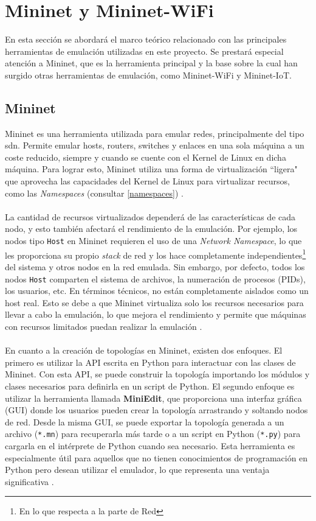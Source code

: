 \section{Mininet y Mininet-WiFi}
\label{sec:mininet}

En esta sección se abordará el marco teórico relacionado con las principales herramientas de emulación utilizadas en este proyecto. Se prestará especial atención a Mininet, que es la herramienta principal y la base sobre la cual han surgido otras herramientas de emulación, como Mininet-WiFi y Mininet-IoT.\\

\subsection{Mininet}

Mininet es una herramienta utilizada para emular redes, principalmente del tipo \gls{sdn}. Permite emular hosts, routers, switches y enlaces en una sola máquina a un coste reducido, siempre y cuando se cuente con el Kernel de Linux en dicha máquina. Para lograr esto, Mininet utiliza una forma de virtualización ``ligera" que aprovecha las capacidades del Kernel de Linux para virtualizar recursos, como las \textit{Namespaces} (consultar \ref{namespaces}) \cite{lantz2010network}.\\
\\
La cantidad de recursos virtualizados dependerá de las características de cada nodo, y esto también afectará el rendimiento de la emulación. Por ejemplo, los nodos tipo \texttt{Host} en Mininet requieren el uso de una \textit{Network Namespace}, lo que les proporciona su propio \textit{stack} de red y los hace completamente independientes\footnote{En lo que respecta a la parte de Red} del sistema y otros nodos en la red emulada. Sin embargo, por defecto, todos los nodos \texttt{Host} comparten el sistema de archivos, la numeración de procesos (PIDs), los usuarios, etc. En términos técnicos, no están completamente aislados como un host real. Esto se debe a que Mininet virtualiza solo los recursos necesarios para llevar a cabo la emulación, lo que mejora el rendimiento y permite que máquinas con recursos limitados puedan realizar la emulación \cite{lantz2010network}.\\
\\
En cuanto a la creación de topologías en Mininet, existen dos enfoques. El primero es utilizar la API escrita en Python para interactuar con las clases de Mininet. Con esta API, se puede construir la topología importando los módulos y clases necesarios para definirla en un script de Python. El segundo enfoque es utilizar la herramienta llamada \textbf{MiniEdit}, que proporciona una interfaz gráfica (GUI) donde los usuarios pueden crear la topología arrastrando y soltando nodos de red. Desde la misma GUI, se puede exportar la topología generada a un archivo (\texttt{*.mn}) para recuperarla más tarde o a un script en Python (\texttt{*.py}) para cargarla en el intérprete de Python cuando sea necesario. Esta herramienta es especialmente útil para aquellos que no tienen conocimientos de programación en Python pero desean utilizar el emulador, lo que representa una ventaja significativa \cite{lantz2010network}.\\

